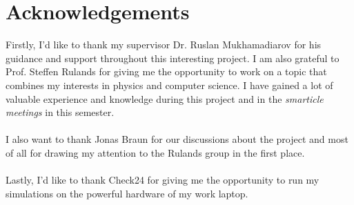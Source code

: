 \chapter*{Acknowledgements}
Firstly, I'd like to thank my supervisor Dr. Ruslan Mukhamadiarov for his guidance and support throughout this interesting project. I am also grateful to Prof. Steffen Rulands for giving me the opportunity to work on a topic that combines my interests in physics and computer science. I have gained a lot of valuable experience and knowledge during this project and in the \textit{smarticle meetings} in this semester. 
\\
\\
I also want to thank Jonas Braun for our discussions about the project and most of all for drawing my attention to the Rulands group in the first place. 
\\
\\
Lastly, I'd like to thank Check24 for giving me the opportunity to run my simulations on the powerful hardware of my work laptop.